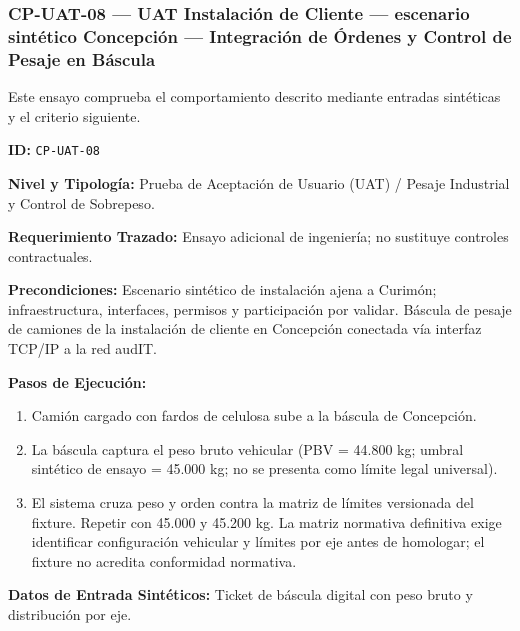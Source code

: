 \subsubsection*{CP-UAT-08 — UAT Instalación de Cliente — escenario sintético Concepción — Integración de Órdenes y Control de Pesaje en Báscula}\label{sec:9-cp-uat-08}
Este ensayo comprueba el comportamiento descrito mediante entradas sintéticas y el criterio siguiente.

\par\noindent\textbf{ID:} \texttt{C\allowbreak{}P\allowbreak{}-\allowbreak{}U\allowbreak{}A\allowbreak{}T\allowbreak{}-\allowbreak{}0\allowbreak{}8\allowbreak{}}\par
\par\noindent\textbf{Nivel y Tipología:} Prueba de Aceptación de Usuario (UAT) / Pesaje Industrial y Control de Sobrepeso.\par
\par\noindent\textbf{Requerimiento Trazado:} Ensayo adicional de ingeniería; no sustituye controles contractuales.\par
\par\noindent\textbf{Precondiciones:} Escenario sintético de instalación ajena a Curimón; infraestructura, interfaces, permisos y participación por validar.  Báscula de pesaje de camiones de la instalación de cliente en Concepción conectada vía interfaz TCP/IP a la red audIT.\par
\par\noindent\textbf{Pasos de Ejecución:} \par
\begin{enumerate}
\item Camión cargado con fardos de celulosa sube a la báscula de Concepción.
\item La báscula captura el peso bruto vehicular (PBV = 44.800 kg; umbral sintético de ensayo = 45.000 kg; no se presenta como límite legal universal).
\item El sistema cruza peso y orden contra la matriz de límites versionada del fixture. Repetir con 45.000 y 45.200 kg. La matriz normativa definitiva exige identificar configuración vehicular y límites por eje antes de homologar; el fixture no acredita conformidad normativa.
\end{enumerate}
\par\noindent\textbf{Datos de Entrada Sintéticos:} Ticket de báscula digital con peso bruto y distribución por eje.\par

